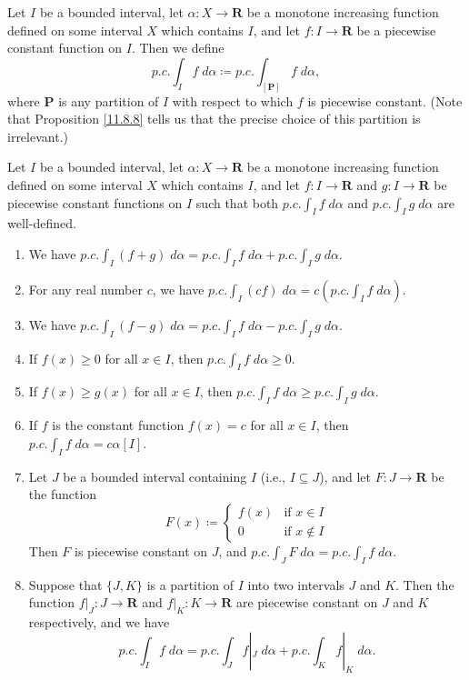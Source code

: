 \begin{definition}\label{11.8.9}
    Let \(I\) be a bounded interval, let \(\alpha : X \to \mathbf{R}\) be a monotone increasing function defined on some interval \(X\) which contains \(I\), and let \(f : I \to \mathbf{R}\) be a piecewise constant function on \(I\).
    Then we define
    \[
        p.c. \int_I f \; d \alpha \coloneqq p.c. \int_{[\mathbf{P}]} f \; d \alpha,
    \]
    where \(\mathbf{P}\) is any partition of \(I\) with respect to which \(f\) is piecewise constant.
    (Note that Proposition \ref{11.8.8} tells us that the precise choice of this partition is irrelevant.)
\end{definition}

\begin{theorem}\label{11.8.10}
    Let \(I\) be a bounded interval, let \(\alpha : X \to \mathbf{R}\) be a monotone increasing function defined on some interval \(X\) which contains \(I\), and let \(f : I \to \mathbf{R}\) and \(g : I \to \mathbf{R}\) be piecewise constant functions on \(I\) such that both \(p.c. \int_I f \; d \alpha\) and \(p.c. \int_I g \; d \alpha\) are well-defined.
    \begin{enumerate}
        \item We have \(p.c. \int_I (f + g) \; d \alpha = p.c. \int_I f \; d \alpha + p.c. \int_I g \; d \alpha\).
        \item For any real number \(c\), we have \(p.c. \int_I (cf) \; d \alpha = c (p.c. \int_I f \; d \alpha)\).
        \item We have \(p.c. \int_I (f - g) \; d \alpha = p.c. \int_I f \; d \alpha - p.c. \int_I g \; d \alpha\).
        \item If \(f(x) \geq 0\) for all \(x \in I\), then \(p.c. \int_I f \; d \alpha \geq 0\).
        \item If \(f(x) \geq g(x)\) for all \(x \in I\), then \(p.c. \int_I f \; d \alpha \geq p.c. \int_I g \; d \alpha\).
        \item If \(f\) is the constant function \(f(x) = c\) for all \(x \in I\), then \(p.c. \int_I f \; d \alpha = c \alpha[I]\).
        \item Let \(J\) be a bounded interval containing \(I\) (i.e., \(I \subseteq J\)), and let \(F : J \to \mathbf{R}\) be the function
              \[
                  F(x) \coloneqq \begin{cases}
                      f(x) & \text{if } x \in I    \\
                      0    & \text{if } x \notin I
                  \end{cases}
              \]
              Then \(F\) is piecewise constant on \(J\), and \(p.c. \int_J F \; d \alpha = p.c. \int_I f \; d \alpha\).
        \item Suppose that \(\{J, K\}\) is a partition of \(I\) into two intervals \(J\) and \(K\).
              Then the function \(f|_J : J \to \mathbf{R}\) and \(f|_K : K \to \mathbf{R}\) are piecewise constant on \(J\) and \(K\) respectively, and we have
              \[
                  p.c. \int_I f \; d \alpha = p.c. \int_J f|_J \; d \alpha + p.c. \int_K f|_K \; d \alpha.
              \]
    \end{enumerate}
\end{theorem}

